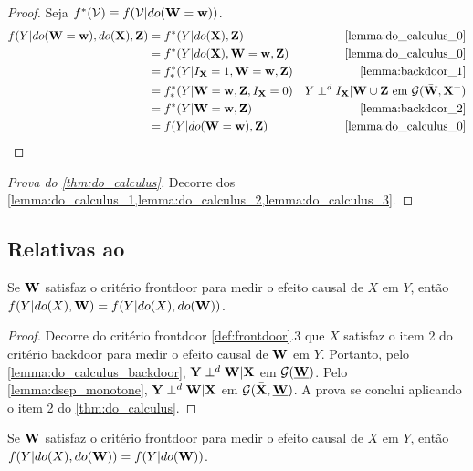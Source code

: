 \begin{proof}
 Seja $f^*({\mathcal V}) \equiv f({\mathcal V}|do({\mathbf{W}}={\mathbf{w}}))$.
 \begin{align*}
  f(Y|do(\W=\w), do(\X), \Z)
  &= f^*(Y|do(\X),\Z) 
  & \text{\cref{lemma:do_calculus_0}} \\
  &= f^*(Y|do(\X),\W=\w,\Z)
  & \text{\cref{lemma:do_calculus_0}} \\ 
  &= f^*_*(Y|I_{\X} = 1, \W=\w, \Z)
  & \text{\cref{lemma:backdoor_1}} \\
  &= f^*_*(Y|\W=\w, \Z, I_{\X}=0)
  & Y \dsep I_{\X} | \W \cup \Z
  \text{ em } \sG(\bar{\W}, \X^{+}) \\
  &= f^*(Y|\W=\w, \Z) 
  & \text{\cref{lemma:backdoor_2}} \\
  &= f(Y|do(\W=\w), \Z)
  & \text{\cref{lemma:do_calculus_0}}
 \end{align*}
\end{proof}

\begin{proof}[Prova do \cref{thm:do_calculus}]
 Decorre dos 
 \cref{lemma:do_calculus_1,lemma:do_calculus_2,lemma:do_calculus_3}.
\end{proof}

\subsection{Relativas ao }

\begin{lemma}
 \label{lemma:frontdoor_1}
 Se ${\mathbf{W}}$ satisfaz o critério frontdoor para
 medir o efeito causal de $X$ em $Y$, então
 $f(Y|do(X),{\mathbf{W}}) = f(Y|do(X),do({\mathbf{W}}))$.
\end{lemma}

\begin{proof}
 Decorre do critério frontdoor \cref{def:frontdoor}.3 que
 $X$ satisfaz o item 2 do critério backdoor para
 medir o efeito causal de ${\mathbf{W}}$ em $Y$.
 Portanto, pelo \cref{lemma:do_calculus_backdoor},
 ${\mathbf{Y}} \perp^d {\mathbf{W}} | {\mathbf{X}}$ em ${\mathcal G}(\underline{{\mathbf{W}}})$.
 Pelo \cref{lemma:dsep_monotone},
 ${\mathbf{Y}} \perp^d {\mathbf{W}} | {\mathbf{X}}$ em ${\mathcal G}(\bar{{\mathbf{X}}}, \underline{{\mathbf{W}}})$.
 A prova se conclui aplicando o item 2
 do \cref{thm:do_calculus}.
\end{proof}

\begin{lemma}
 \label{lemma:frontdoor_2}
 Se ${\mathbf{W}}$ satisfaz o critério frontdoor para
 medir o efeito causal de $X$ em $Y$, então
 $f(Y|do(X),do({\mathbf{W}})) = f(Y|do({\mathbf{W}}))$.
\end{lemma}

